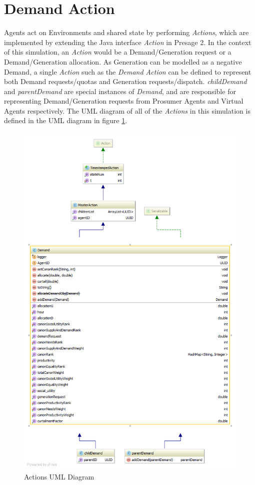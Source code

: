 \clearpage

\section*{Demand Action}
Agents act on Environments and shared state by performing \textit{Actions}, which are implemented by extending the Java interface \textit{Action} in Presage 2. In the context of this simulation, an \textit{Action} would be a Demand/Generation request or a Demand/Generation allocation. As Generation can be modelled as a negative Demand, a single \textit{Action} such as the \textit{Demand Action} can be defined to represent both Demand requests/quotas and Generation requests/dispatch. \textit{childDemand} and \textit{parentDemand} are special instances of \textit{Demand}, and are responsible for representing Demand/Generation requests from Prosumer Agents and Virtual Agents respectively. The UML diagram of all of the \textit{Actions} in this simulation is defined in the UML diagram in figure \ref{fig:ActionUML}.

\begin{figure}[!h]
	\centering
	\includegraphics[scale=0.5]{Images/ActionUML.png}
	\caption{Actions UML Diagram}
	\label{fig:ActionUML}
\end{figure}

